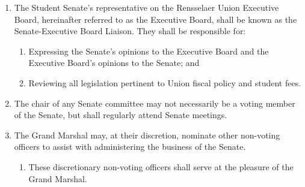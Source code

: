 \documentclass{uniondoc}
\begin{document}
\begin{enumerate}
	\item The Student Senate’s representative on the Rensselaer Union Executive Board, hereinafter referred to as the Executive Board, shall be known as the Senate-Executive Board Liaison.
	      They shall be responsible for:
	      \begin{enumerate}
		      \item Expressing the Senate’s opinions to the Executive Board and the Executive Board’s opinions to the Senate; and
		      \item Reviewing all legislation pertinent to Union fiscal policy and student fees.
	      \end{enumerate}
	\item The chair of any Senate committee may not necessarily be a voting member of the Senate,
	      but shall regularly attend Senate meetings.
	\item The Grand Marshal may, at their discretion, nominate other non-voting officers to assist with administering the business of the Senate.
	      \begin{enumerate}
		      \item These discretionary non-voting officers shall serve at the pleasure of the Grand Marshal.
	      \end{enumerate}
\end{enumerate}

\end{document}
